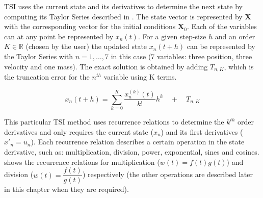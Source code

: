 

\ac{TSI} uses the current state and its derivatives to determine the next state by computing its Taylor Series described in . The state vector is represented by $\mathbf{X}$ with the corresponding vector for the initial conditions $\mathbf{X}_{0}$. Each of the variables can at any point be represented by $x_{n}\left(t\right)$. For a given step-size $h$ and an order $K \in \mathbb{R}$ (chosen by the user) the updated state $x_{n}\left(t+h\right)$ can be represented by the Taylor Series with $n=1,\dots,7$ in this case (7 variables: three position, three velocity and one mass). The exact solution is obtained by adding $T_{n,K}$, which is the truncation error for the $n^{th}$ variable using K terms. 



\begin{equation} \label{eq:general_taylor}
x_{n}\left(t+h\right)=\displaystyle\sum_{k=0}^{K}\dfrac{x_{n}^{\left(k\right)}\left(t\right)}{k!}h^{k} \quad + \quad	T_{n,K}
\end{equation}

This particular \ac{TSI} method uses recurrence relations to determine the $k^{th}$ order derivatives and only requires the current state ($x_{n}$) and its first derivatives ($x'_{n} = u_{n}$). Each recurrence relation describes a certain operation in the state derivative, such as: multiplication, division, power, exponential, sines and cosines.  shows the recurrence relations for multiplication ($w\left(t\right)=f\left(t\right)g\left(t\right)$) and division ($w\left(t\right)=\dfrac{f\left(t\right)}{g\left(t\right)}$) respectively (the other operations are described later in this chapter when they are required).


